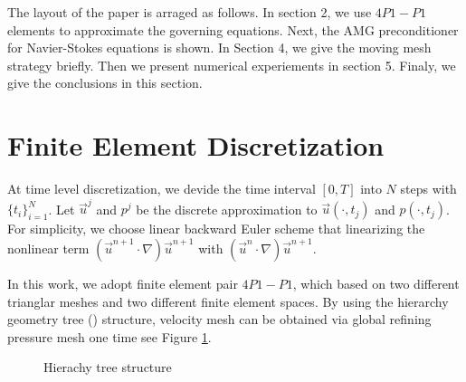 \documentclass{eajam}
\begin{document}
       The layout of the paper is arraged as follows. In
    section 2, we use $4P1-P1$ elements to approximate the governing
    equations. Next, the AMG preconditioner for
    Navier-Stokes equations is shown. In Section 4, we give the moving mesh
    strategy briefly. Then we present numerical experiements in section 5. 
    Finaly, we give the conclusions in this section.

\section{Finite Element Discretization}
   \label{sec2} At time level discretization, we devide the time
   interval $[0, T]$ into $N$ steps with $\{ t_i\}_{i = 1}^N$. Let
   $\vec{u}^j$ and $p^j$ be the discrete approximation to
   $\vec{u}(\cdot, t_j)$ and $p(\cdot, t_j)$. For simplicity, we
   choose linear backward Euler scheme that linearizing the
   nonlinear term $(\vec{u}^{n + 1} \cdot \nabla) \vec{u}^{n + 1}$
   with $(\vec{u}^n \cdot \nabla) \vec{u}^{n + 1}$.

   In this work, we adopt finite element pair $4P1-P1$,
   which based on two different trianglar meshes and two different
   finite element spaces. By using the hierarchy geometry tree
   (\cite{li2005multi}) structure, velocity mesh can be
   obtained via global refining pressure mesh one time see Figure
   \ref{fig::hgeometry_tree}.
   
   \begin{figure}[h]
     \caption{Hierachy tree structure}
     \label{fig::hgeometry_tree}
   \end{figure}
\end{document}
